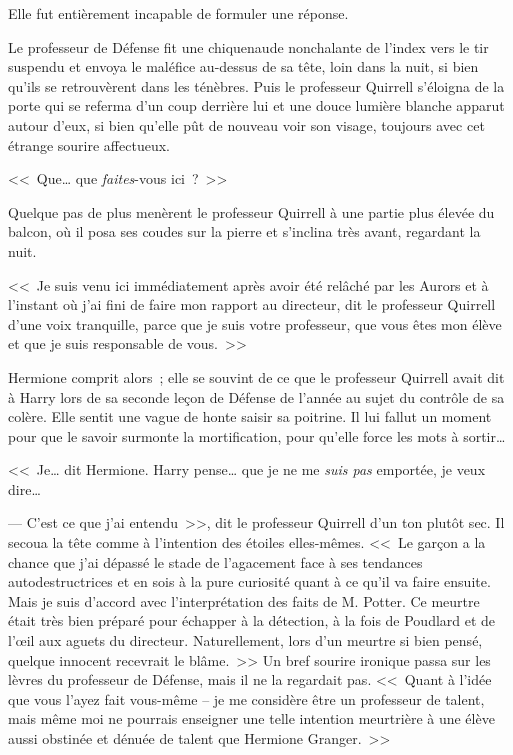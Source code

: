 Elle fut entièrement incapable de formuler une réponse.

Le professeur de Défense fit une chiquenaude nonchalante de l'index vers le tir suspendu et envoya le maléfice au-dessus de sa tête, loin dans la nuit, si bien qu'ils se retrouvèrent dans les ténèbres. Puis le professeur Quirrell s'éloigna de la porte qui se referma d'un coup derrière lui et une douce lumière blanche apparut autour d'eux, si bien qu'elle pût de nouveau voir son visage, toujours avec cet étrange sourire affectueux.

<<~Que… que \emph{faites}-vous ici~?~>>

Quelque pas de plus menèrent le professeur Quirrell à une partie plus élevée du balcon, où il posa ses coudes sur la pierre et s'inclina très avant, regardant la nuit.

<<~Je suis venu ici immédiatement après avoir été relâché par les Aurors et à l'instant où j'ai fini de faire mon rapport au directeur, dit le professeur Quirrell d'une voix tranquille, parce que je suis votre professeur, que vous êtes mon élève et que je suis responsable de vous.~>>

Hermione comprit alors~; elle se souvint de ce que le professeur Quirrell avait dit à Harry lors de sa seconde leçon de Défense de l'année au sujet du contrôle de sa colère. Elle sentit une vague de honte saisir sa poitrine. Il lui fallut un moment pour que le savoir surmonte la mortification, pour qu'elle force les mots à sortir…

<<~Je… dit Hermione. Harry pense… que je ne me \emph{suis pas} emportée, je veux dire…

--- C'est ce que j'ai entendu~>>, dit le professeur Quirrell d'un ton plutôt sec. Il secoua la tête comme à l'intention des étoiles elles-mêmes. <<~Le garçon a la chance que j'ai dépassé le stade de l'agacement face à ses tendances autodestructrices et en sois à la pure curiosité quant à ce qu'il va faire ensuite. Mais je suis d'accord avec l'interprétation des faits de M. Potter. Ce meurtre était très bien préparé pour échapper à la détection, à la fois de Poudlard et de l'œil aux aguets du directeur. Naturellement, lors d'un meurtre si bien pensé, quelque innocent recevrait le blâme.~>> Un bref sourire ironique passa sur les lèvres du professeur de Défense, mais il ne la regardait pas. <<~Quant à l'idée que vous l'ayez fait vous-même -- je me considère être un professeur de talent, mais même moi ne pourrais enseigner une telle intention meurtrière à une élève aussi obstinée et dénuée de talent que Hermione Granger.~>>

